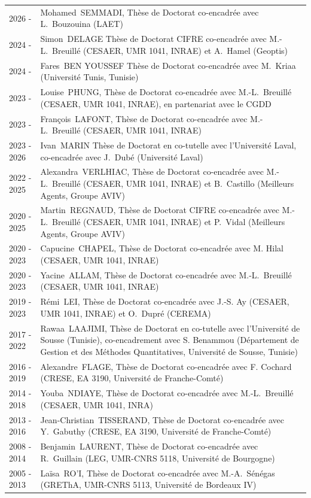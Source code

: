 \documentclass[a4paper,12pt]{article}
\begin{document}
\noindent \begin{longtable}{@{}p{\annee}p{\texte}@{}}
2026 -		& Mohamed~SEMMADI, Thèse de Doctorat co-encadrée avec L.~Bouzouina (LAET) \\
2024 -		& Simon~DELAGE Thèse de Doctorat CIFRE co-encadrée avec M.-L.~Breuillé (CESAER, UMR 1041, INRAE) et A.~Hamel (Geoptis) \\
2024 -		& Fares~BEN YOUSSEF Thèse de Doctorat co-encadrée avec M.~Kriaa (Université Tunis, Tunisie) \\
2023 -		& Louise~PHUNG, Thèse de Doctorat co-encadrée avec M.-L.~Breuillé (CESAER, UMR 1041, INRAE), en partenariat avec le CGDD \\
2023 -		& François~LAFONT, Thèse de Doctorat co-encadrée avec M.-L.~Breuillé (CESAER, UMR 1041, INRAE) \\
2023 -	2026 	& Ivan~MARIN Thèse de Doctorat en co-tutelle avec l'Université Laval, co-encadrée avec J.~Dubé (Université Laval) \\
2022 - 2025	& Alexandra~VERLHIAC, Thèse de Doctorat co-encadrée avec M.-L.~Breuillé (CESAER, UMR 1041, INRAE) et B.~Castillo (Meilleurs Agents, Groupe AVIV) \\
2020 - 2025	& Martin~REGNAUD, Thèse de Doctorat CIFRE co-encadrée avec M.-L.~Breuillé (CESAER, UMR 1041, INRAE) et P.~Vidal (Meilleurs Agents, Groupe AVIV) \\
2020 - 2023	& Capucine~CHAPEL, Thèse de Doctorat co-encadrée avec M. Hilal (CESAER, UMR 1041, INRAE) \\
2020 - 2023	& Yacine~ALLAM, Thèse de Doctorat co-encadrée avec M.-L.~Breuillé (CESAER, UMR 1041, INRAE) \\
2019 - 2023	& Rémi~LEI, Thèse de Doctorat co-encadrée avec J.-S. Ay (CESAER, UMR 1041, INRAE) et O.~Dupré (CEREMA) \\
2017 - 2022	& Rawaa~LAAJIMI, Thèse de Doctorat en co-tutelle avec l'Université de Sousse (Tunisie), co-encadrement avec S. Benammou (Département de Gestion et des Méthodes Quantitatives, Université de Sousse, Tunisie) \\
2016 - 2019 & Alexandre~FLAGE, Thèse de Doctorat co-encadrée avec F. Cochard (CRESE, EA 3190, Université de Franche-Comté) \\
2014 - 2018 & Youba~NDIAYE, Thèse de Doctorat co-encadrée avec M.-L.~Breuillé (CESAER, UMR 1041, INRA) \\
2013 - 2016 & Jean-Christian~TISSERAND, Thèse de Doctorat co-encadrée avec Y.~Gabuthy (CRESE, EA 3190, Université de Franche-Comté) \\
2008 - 2014 & Benjamin~LAURENT, Thèse de Doctorat co-encadrée avec R.~Guillain (LEG, UMR-CNRS 5118, Université de Bourgogne) \\
2005 - 2013 & Laïsa~RO'I, Thèse de Doctorat co-encadrée avec M.-A.~Sénégas (GREThA, UMR-CNRS 5113, Université de Bordeaux IV)
\end{longtable}
\end{document}
